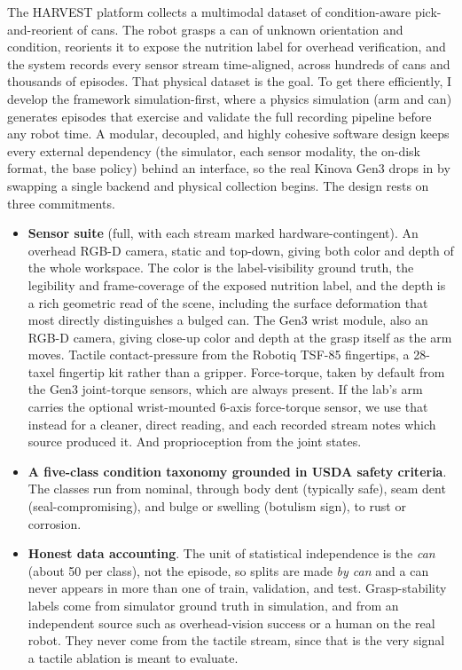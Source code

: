 \documentclass[11pt]{article}
\begin{document}
The HARVEST platform collects a multimodal dataset of condition-aware pick-and-reorient of cans. The robot grasps a can of unknown orientation and condition, reorients it to expose the nutrition label for overhead verification, and the system records every sensor stream time-aligned, across hundreds of cans and thousands of episodes. That physical dataset is the goal. To get there efficiently, I develop the framework simulation-first, where a physics simulation (arm and can) generates episodes that exercise and validate the full recording pipeline before any robot time. A modular, decoupled, and highly cohesive software design keeps every external dependency (the simulator, each sensor modality, the on-disk format, the base policy) behind an interface, so the real Kinova Gen3 drops in by swapping a single backend and physical collection begins. The design rests on three commitments.
\begin{itemize}
\item \textbf{Sensor suite} (full, with each stream marked hardware-contingent). An overhead RGB-D camera, static and top-down, giving both color and depth of the whole workspace. The color is the label-visibility ground truth, the legibility and frame-coverage of the exposed nutrition label, and the depth is a rich geometric read of the scene, including the surface deformation that most directly distinguishes a bulged can. The Gen3 wrist module, also an RGB-D camera, giving close-up color and depth at the grasp itself as the arm moves. Tactile contact-pressure from the Robotiq TSF-85 fingertips, a 28-taxel fingertip kit rather than a gripper. Force-torque, taken by default from the Gen3 joint-torque sensors, which are always present. If the lab's arm carries the optional wrist-mounted 6-axis force-torque sensor, we use that instead for a cleaner, direct reading, and each recorded stream notes which source produced it. And proprioception from the joint states.
\item \textbf{A five-class condition taxonomy grounded in USDA safety criteria}. The classes run from nominal, through body dent (typically safe), seam dent (seal-compromising), and bulge or swelling (botulism sign), to rust or corrosion.
\item \textbf{Honest data accounting}. The unit of statistical independence is the \emph{can} (about 50 per class), not the episode, so splits are made \emph{by can} and a can never appears in more than one of train, validation, and test. Grasp-stability labels come from simulator ground truth in simulation, and from an independent source such as overhead-vision success or a human on the real robot. They never come from the tactile stream, since that is the very signal a tactile ablation is meant to evaluate.
\end{itemize}
\end{document}
